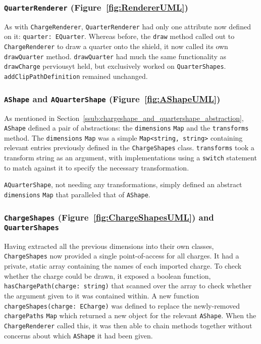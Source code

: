\documentclass[nobib, a4paper, twoside, justified]{tufte-book}
\makeatletter
\newcommand{\charge}{\gls{charge}\@\xspace}
\newcommand{\charges}{\glspl{charge}\@\xspace}
\makeatother
\begin{document}
\subsubsection{\texttt{QuarterRenderer} (Figure~\ref{fig:RendererUML})}%
\label{ssub:quarterrenderer}

As with \texttt{ChargeRenderer}, \texttt{QuarterRenderer} had only one attribute now defined on it:
\texttt{quarter: EQuarter}. Whereas before, the \texttt{draw} method called out to
\texttt{ChargeRenderer} to draw a quarter onto the shield, it now called its own
\texttt{drawQuarter} method. \texttt{drawQuarter} had much the same functionality as
\texttt{drawCharge} perviousyt held, but exclusively worked on \texttt{QuarterShapes}.
\texttt{addClipPathDefinition} remained unchanged.

\subsubsection{\texttt{AShape} and \texttt{AQuarterShape} (Figure~\ref{fig:AShapeUML})}%
\label{ssub:ashape_and_aquartershape}

As mentioned in Section~\ref{ssub:chargeshape_and_quartershape_abstraction}, \texttt{AShape}
defined a pair of abstractions: the \texttt{dimensions} \texttt{Map} and the \texttt{transforms}
method. The \texttt{dimensions} \texttt{Map} was a simple \texttt{Map<string, string>} containing
relevant entries previously defined in the \texttt{ChargeShapes} class. \texttt{transforms} took a
transform string as an argument, with implementations using a \texttt{switch} statement to match
against it to specify the necessary transformation.

\texttt{AQuarterShape}, not needing any transformations, simply defined an abstract
\texttt{dimensions} \texttt{Map} that paralleled that of \texttt{AShape}.

\subsubsection{\texttt{ChargeShapes} (Figure~\ref{fig:ChargeShapesUML}) and \texttt{QuarterShapes}}%
\label{ssub:chargeshapes_and_quartershapes}

Having extracted all the previous dimensions into their own classes, \texttt{ChargeShapes} now
provided a single point-of-access for all \charges. It had a private, static array containing the
names of each imported \charge. To check whether the \charge could be drawn, it exposed a boolean
function, \texttt{hasChargePath(charge: string)} that scanned over the array to check whether the
argument given to it was contained within. A new function \texttt{chargeShapes(charge: ECharge)}
was defined to replace the newly-removed \texttt{chargePaths} \texttt{Map} which returned a new
object for the relevant \texttt{AShape}. When the \texttt{ChargeRenderer} called this, it was then able to
chain methods together without concerns about which \texttt{AShape} it had been given.
\end{document}
